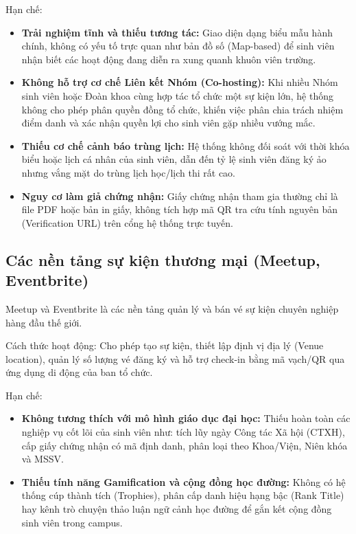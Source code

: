 Hạn chế:
\begin{itemize}
    \item \textbf{Trải nghiệm tĩnh và thiếu tương tác:} Giao diện dạng biểu mẫu hành chính, không có yếu tố trực quan như bản đồ số (Map-based) để sinh viên nhận biết các hoạt động đang diễn ra xung quanh khuôn viên trường.
    \item \textbf{Không hỗ trợ cơ chế Liên kết Nhóm (Co-hosting):} Khi nhiều Nhóm sinh viên hoặc Đoàn khoa cùng hợp tác tổ chức một sự kiện lớn, hệ thống không cho phép phân quyền đồng tổ chức, khiến việc phân chia trách nhiệm điểm danh và xác nhận quyền lợi cho sinh viên gặp nhiều vướng mắc.
    \item \textbf{Thiếu cơ chế cảnh báo trùng lịch:} Hệ thống không đối soát với thời khóa biểu hoặc lịch cá nhân của sinh viên, dẫn đến tỷ lệ sinh viên đăng ký ảo nhưng vắng mặt do trùng lịch học/lịch thi rất cao.
    \item \textbf{Nguy cơ làm giả chứng nhận:} Giấy chứng nhận tham gia thường chỉ là file PDF hoặc bản in giấy, không tích hợp mã QR tra cứu tính nguyên bản (Verification URL) trên cổng hệ thống trực tuyến.
\end{itemize}

\subsection{Các nền tảng sự kiện thương mại (Meetup, Eventbrite)}

Meetup và Eventbrite là các nền tảng quản lý và bán vé sự kiện chuyên nghiệp hàng đầu thế giới\cite{foth2011handbook}.

Cách thức hoạt động: Cho phép tạo sự kiện, thiết lập định vị địa lý (Venue location), quản lý số lượng vé đăng ký và hỗ trợ check-in bằng mã vạch/QR qua ứng dụng di động của ban tổ chức.

Hạn chế:
\begin{itemize}
    \item \textbf{Không tương thích với mô hình giáo dục đại học:} Thiếu hoàn toàn các nghiệp vụ cốt lõi của sinh viên như: tích lũy ngày Công tác Xã hội (CTXH), cấp giấy chứng nhận có mã định danh, phân loại theo Khoa/Viện, Niên khóa và MSSV.
    \item \textbf{Thiếu tính năng Gamification và cộng đồng học đường:} Không có hệ thống cúp thành tích (Trophies), phân cấp danh hiệu hạng bậc (Rank Title) hay kênh trò chuyện thảo luận ngữ cảnh học đường để gắn kết cộng đồng sinh viên trong campus.
\end{itemize}

